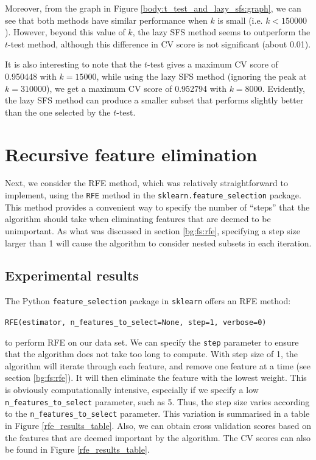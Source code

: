 \documentclass[12pt, twoside, a4paper]{report}
\begin{document}
Moreover, from the graph in Figure \ref{body:t_test_and_lazy_sfs:graph}, we can see that both methods have similar performance when $k$ is small (i.e. $k<150000$). However, beyond this value of $k$, the lazy SFS method seems to outperform the $t$-test method, although this difference in CV score is not significant (about 0.01).

It is also interesting to note that the $t$-test gives a maximum CV score of 0.950448 with $k=15000$, while using the lazy SFS method (ignoring the peak at $k=310000$), we get a maximum CV score of 0.952794 with $k=8000$. Evidently, the lazy SFS method can produce a smaller subset that performs slightly better than the one selected by the $t$-test.



\section{Recursive feature elimination} \label{body:rfe}

Next, we consider the RFE method, which was relatively straightforward to implement, using the \texttt{RFE} method in the \texttt{sklearn.feature\_selection} package. This method provides a convenient way to specify the number of ``steps'' that the algorithm should take when eliminating features that are deemed to be unimportant. As what was discussed in section \ref{bg:fs:rfe}, specifying a step size larger than 1 will cause the algorithm to consider nested subsets in each iteration.

\subsection{Experimental results}

The Python \texttt{feature\_selection} package in \texttt{sklearn} offers an RFE method:
\begin{center}
\texttt{RFE(estimator, n\_features\_to\_select=None, step=1, verbose=0)}
\end{center}

to perform RFE on our data set. We can specify the \texttt{step} parameter to ensure that the algorithm does not take too long to compute. With step size of 1, the algorithm will iterate through each feature, and remove one feature at a time (see section \ref{bg:fs:rfe}). It will then eliminate the feature with the lowest weight. This is obviously computationally intensive, especially if we specify a low \texttt{n\_features\_to\_select} parameter, such as 5. Thus, the step size varies according to the \texttt{n\_features\_to\_select} parameter. This variation is summarised in a table in Figure \ref{rfe_results_table}. Also, we can obtain cross validation scores based on the features that are deemed important by the algorithm. The CV scores can also be found in Figure \ref{rfe_results_table}.
\end{document}

